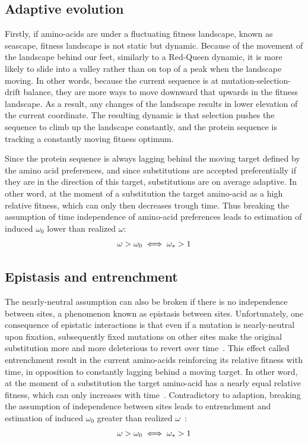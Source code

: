 \subsection{Adaptive evolution}
\label{subsec:adaptive-evolution}

Firstly, if amino-acids are under a fluctuating fitness landscape, known as seascape, fitness landscape is not static but dynamic.
Because of the movement of the landscape behind our feet, similarly to a Red-Queen dynamic, it is more likely to slide into a valley rather than on top of a peak when the landscape moving.
In other words, because the current sequence is at mutation-selection-drift balance, they are more ways to move downward that upwards in the fitness landscape.
As a result, any changes of the landscape results in lower elevation of the current coordinate.
The resulting dynamic is that selection pushes the sequence to climb up the landscape constantly, and the protein sequence is tracking a constantly moving fitness optimum.

Since the protein sequence is always lagging behind the moving target defined by the amino acid preferences, and since \glspl{substitution} are accepted preferentially if they are in the direction of this target, \glspl{substitution} are on average adaptive.
In other word, at the moment of a \gls{substitution} the target amino-acid as a high relative fitness, which can only then decreases trough time.
Thus breaking the assumption of time independence of amino-acid preferences leads to estimation of induced $\omega_0$ lower than realized $\omega$:
\begin{equation}
    \omega > \omega_0 \\
    \iff \omega_* > 1
\end{equation}

\subsection{Epistasis and entrenchment}

The \gls{nearly-neutral} assumption can also be broken if there is no independence between sites, a phenomenon known as epistasis between sites.
Unfortunately, one consequence of epistatic interactions is that even if a mutation is \gls{nearly-neutral} upon fixation, subsequently fixed mutations on other sites make the original \gls{substitution} more and more deleterious to revert over time~\citep{Gong2014, Lunzer2010, Mccandlish2013}.
This effect called entrenchment result in the current amino-acids reinforcing its relative fitness with time, in opposition to constantly lagging behind a moving target.
In other word, at the moment of a \gls{substitution} the target amino-acid has a nearly equal relative fitness, which can only increases with time~\citep{Goldstein2016, Goldstein2017}.
Contradictory to adaption, breaking the assumption of independence between sites leads to entrenchment and estimation of induced $\omega_0$ greater than realized $\omega$~\citep{Rodrigue2016}:
\begin{equation}
    \omega > \omega_0 \\
    \iff \omega_* > 1
\end{equation}

